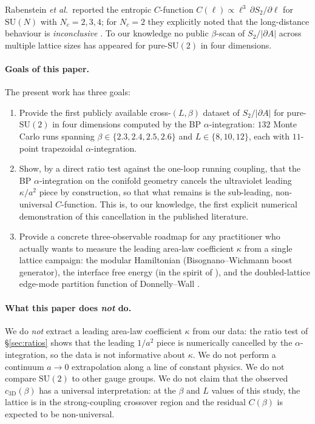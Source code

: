 \documentclass[11pt,a4paper]{article}
\theoremstyle{definition}
\newcommand{\SUtwo}{\mathrm{SU}(2)}
\newcommand{\SUN}{\mathrm{SU}(N)}
\newcommand{\threeD}{{3\text{D}}}
\begin{document}
Rabenstein \emph{et al.}\,\cite{Rabenstein2019} reported the entropic
$C$-function $C(\ell) \propto \ell^{3}\,\partial S_{2}/\partial\ell$
for $\SUN$ with $N_{c}=2,3,4$; for $N_{c}=2$ they explicitly noted
that the long-distance behaviour is \emph{inconclusive}
\cite{Rabenstein2019}. To our knowledge no public $\beta$-scan of
$S_{2}/|\partial A|$ across multiple lattice sizes has appeared for
pure-$\SUtwo$ in four dimensions.

\paragraph{Goals of this paper.} The present work has three goals:
\begin{enumerate}[label=(\roman*),leftmargin=*]
\item Provide the first publicly available cross-$(L,\beta)$ dataset
      of $S_{2}/|\partial A|$ for pure-$\SUtwo$ in four dimensions
      computed by the BP $\alpha$-integration: $132$ Monte Carlo
      runs spanning $\beta\in\{2.3,2.4,2.5,2.6\}$ and
      $L\in\{8,10,12\}$, each with $11$-point trapezoidal
      $\alpha$-integration.
\item Show, by a direct ratio test against the one-loop running
      coupling, that the BP $\alpha$-integration on the conifold
      geometry cancels the ultraviolet leading $\kappa/a^{2}$ piece
      by construction, so that what remains is the sub-leading,
      non-universal $C$-function. This is, to our knowledge, the
      first explicit numerical demonstration of this cancellation
      in the published literature.
\item Provide a concrete three-observable roadmap for any practitioner
      who actually wants to measure the leading area-law coefficient
      $\kappa$ from a single lattice campaign: the modular
      Hamiltonian (Bisognano--Wichmann boost generator), the
      interface free energy (in the spirit of
      \cite{LuciniTeperWenger2005}), and the doubled-lattice
      edge-mode partition function of
      Donnelly--Wall \cite{Donnelly2012,DonnellyWall2014}.
\end{enumerate}

\paragraph{What this paper does \emph{not} do.} We do \emph{not}
extract a leading area-law coefficient $\kappa$ from our data: the
ratio test of \S\ref{sec:ratios} shows that the leading $1/a^{2}$
piece is numerically cancelled by the $\alpha$-integration, so the
data is not informative about $\kappa$. We do not perform a continuum
$a\to 0$ extrapolation along a line of constant physics. We do not
compare $\SUtwo$ to other gauge groups. We do not claim that the
observed $c_{\threeD}(\beta)$ has a universal interpretation: at the
$\beta$ and $L$ values of this study, the lattice is in the
strong-coupling crossover region and the residual $C(\beta)$ is
expected to be non-universal.
\end{document}
